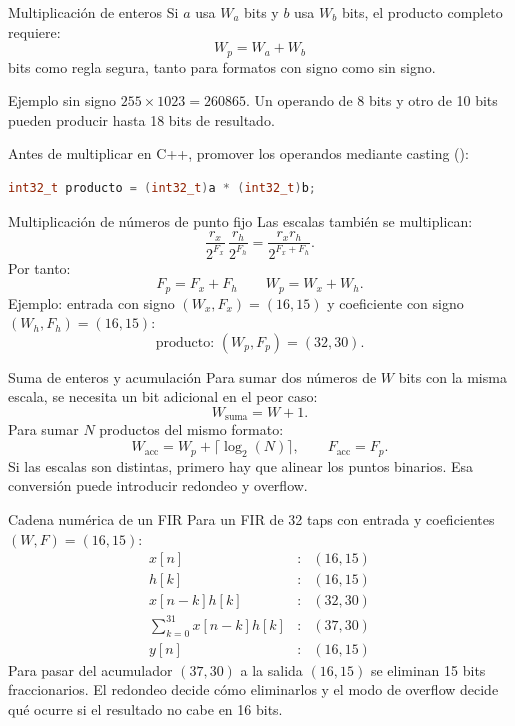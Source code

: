 \documentclass[aspectratio=169,10pt]{beamer}
\begin{document}
\begin{frame}[fragile]{Multiplicación de enteros}
  Si $a$ usa $W_a$ bits y $b$ usa $W_b$ bits, el producto completo requiere:
  \[
    \boxed{W_p=W_a+W_b}
  \]
  bits como regla segura, tanto para formatos con signo como sin signo.
  \begin{exampleblock}{Ejemplo sin signo}
    $255\times 1023=260865$. Un operando de 8 bits y otro de 10 bits pueden
    producir hasta 18 bits de resultado.
  \end{exampleblock}
  Antes de multiplicar en C++, promover los operandos mediante casting ():
  \begin{lstlisting}[language=C++]
int32_t producto = (int32_t)a * (int32_t)b;
  \end{lstlisting}
\end{frame}

\begin{frame}{Multiplicación de números de punto fijo}
  Las escalas también se multiplican:
  \[
    \frac{r_x}{2^{F_x}}\,\frac{r_h}{2^{F_h}}
    =\frac{r_xr_h}{2^{F_x+F_h}}.
  \]
  Por tanto:
  \[
    \boxed{F_p=F_x+F_h}\qquad \boxed{W_p=W_x+W_h}.
  \]
  Ejemplo: entrada con signo $(W_x,F_x)=(16,15)$ y coeficiente con signo
  $(W_h,F_h)=(16,15)$:
  \[
    \text{producto: }(W_p,F_p)=(32,30).
  \]
\end{frame}

\begin{frame}{Suma de enteros y acumulación}
  Para sumar dos números de $W$ bits con la misma escala, se necesita un bit
  adicional en el peor caso:
  \[
    W_{\text{suma}}=W+1.
  \]
  Para sumar $N$ productos del mismo formato:
  \[
    \boxed{W_{\text{acc}}=W_p+\lceil\log_2(N)\rceil},\qquad F_{\text{acc}}=F_p.
  \]
  Si las escalas son distintas, primero hay que alinear los puntos binarios.
  Esa conversión puede introducir redondeo y overflow.
\end{frame}

\begin{frame}{Cadena numérica de un FIR}
  Para un FIR de 32 taps con entrada y coeficientes $(W,F)=(16,15)$:
  \[
  \begin{array}{rcl}
    x[n] &:& (16,15)\\
    h[k] &:& (16,15)\\
    x[n-k]h[k] &:& (32,30)\\
    \sum_{k=0}^{31}x[n-k]h[k] &:& (37,30)\\
    y[n] &:& (16,15)
  \end{array}
  \]
  Para pasar del acumulador $(37,30)$ a la salida $(16,15)$ se eliminan 15
  bits fraccionarios. El redondeo decide cómo eliminarlos y el modo de
  overflow decide qué ocurre si el resultado no cabe en 16 bits.
\end{frame}
\end{document}

